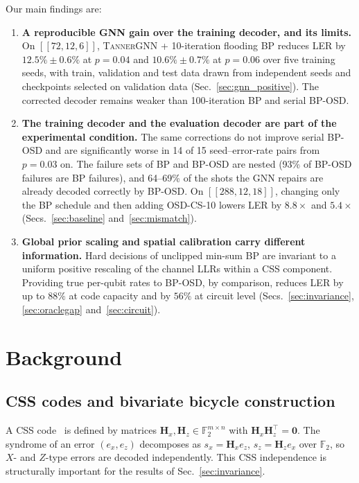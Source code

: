\documentclass[a4paper,twocolumn,11pt,nopdfoutputerror]{quantumarticle}
\newcommand{\F}{\mathbb{F}}
\newcommand{\Hmat}{\mathbf{H}}
\newcommand{\code}[3]{\ensuremath{[\![#1,#2,#3]\!]}}
\begin{document}
Our main findings are:
\begin{enumerate}[leftmargin=*,topsep=3pt,itemsep=3pt]
\item \textbf{A reproducible GNN gain over the training decoder, and its
limits.} On $\code{72}{12}{6}$, \textsc{TannerGNN} + 10-iteration flooding
BP reduces LER by $12.5\%\pm0.6\%$ at $p=0.04$ and $10.6\%\pm0.7\%$ at
$p=0.06$ over five training seeds, with train, validation and test data
drawn from independent seeds and checkpoints selected on validation data
(Sec.~\ref{sec:gnn_positive}). The corrected decoder remains weaker than
100-iteration BP and serial BP-OSD.

\item \textbf{The training decoder and the evaluation decoder are part of
the experimental condition.} The same corrections do not improve serial
BP-OSD and are significantly worse in 14 of 15 seed--error-rate pairs
from $p=0.03$ on. The failure sets of BP
and BP-OSD are nested (93\% of BP-OSD failures are BP failures), and
64--69\% of the shots the GNN repairs are already decoded correctly by
BP-OSD. On $\code{288}{12}{18}$, changing only the BP schedule and then
adding OSD-CS-10 lowers LER by $8.8\times$ and $5.4\times$
(Secs.~\ref{sec:baseline} and~\ref{sec:mismatch}).

\item \textbf{Global prior scaling and spatial calibration carry
different information.} Hard decisions of unclipped min-sum BP are
invariant to a uniform positive rescaling of the channel LLRs within a
CSS component. Providing true per-qubit rates to BP-OSD, by comparison,
reduces LER by up to $88\%$ at code capacity and by $56\%$ at circuit
level (Secs.~\ref{sec:invariance}, \ref{sec:oraclegap}
and~\ref{sec:circuit}).
\end{enumerate}
\section{Background}\label{sec:background}

\subsection{CSS codes and bivariate bicycle construction}

A CSS code~\cite{Calderbank1996Good,Steane1996Error} is defined by
matrices $\Hmat_x, \Hmat_z \in \F_2^{m \times n}$ with
$\Hmat_x \Hmat_z^\top = \mathbf{0}$. The syndrome of an error
$(e_x, e_z)$ decomposes as
$s_x = \Hmat_x e_z$,
$s_z = \Hmat_z e_x$
over $\F_2$, so $X$- and $Z$-type errors are decoded independently.
This CSS independence is structurally important for the results
of Sec.~\ref{sec:invariance}.
\end{document}
